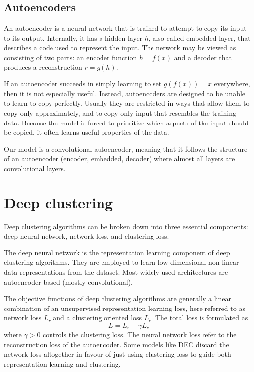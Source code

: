 \subsection{Autoencoders}

An autoencoder is a neural network that is trained to attempt to copy its input to its output. Internally, it has a hidden layer $h$, also called embedded layer, that describes a code used to represent the input. The network may be viewed as consisting of two parts: an encoder function $h=f(x)$ and a decoder that produces a reconstruction $r=g(h)$.

If an autoencoder succeeds in simply learning to set $g(f(x))=x$ everywhere, then it is not especially useful. Instead,
autoencoders are designed to be unable to learn to copy perfectly. Usually they are restricted in ways that allow them to copy only approximately, and to copy only input that resembles the training data. Because the model is forced to prioritize which aspects of the input should be copied, it often learns useful properties of the data.

Our model is a convolutional autoencoder, meaning that it follows the structure of an autoencoder (encoder, embedded, decoder) where almost all layers are convolutional layers.

\section{Deep clustering}

Deep clustering algorithms can be broken down into three essential components: deep neural network, network loss, and clustering loss.

The deep neural network is the representation learning component of deep clustering algorithms. They are employed to learn low dimensional non-linear data representations from the dataset. Most widely used architectures are autoencoder based (mostly convolutional). 

The objective functions of deep clustering algorithms are generally a linear combination of an unsupervised representation learning loss, here referred to as network loss $L_r$ and a clustering oriented loss $L_c$. The total loss is formulated as
\begin{equation}
    L = L_r + \gamma L_c
\end{equation}
where $\gamma > 0$ controls the clustering loss. The neural network loss refer to the reconstruction loss of the autoencoder. Some models like DEC \cite{xie2016unsupervised} discard the network loss altogether in favour of just using clustering loss to guide both representation learning and clustering.


